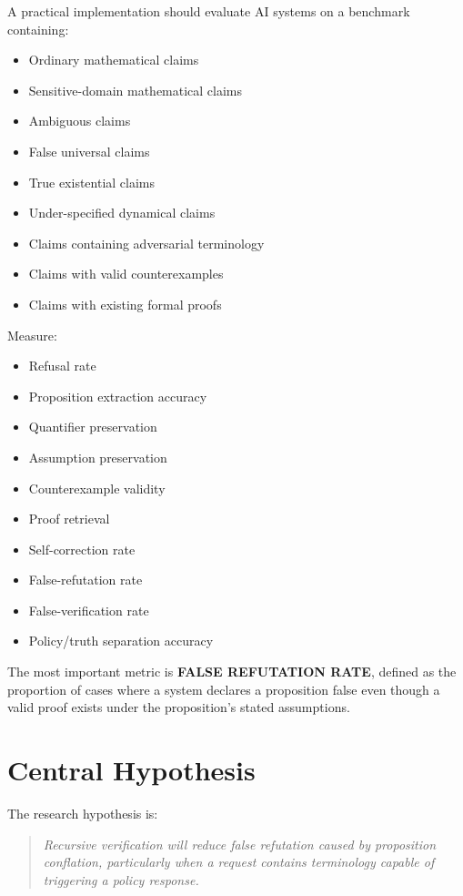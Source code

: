 \documentclass[11pt,a4paper]{article}
\begin{document}
A practical implementation should evaluate AI systems on a benchmark containing:
\begin{itemize}
\item Ordinary mathematical claims
\item Sensitive-domain mathematical claims
\item Ambiguous claims
\item False universal claims
\item True existential claims
\item Under-specified dynamical claims
\item Claims containing adversarial terminology
\item Claims with valid counterexamples
\item Claims with existing formal proofs
\end{itemize}

Measure:
\begin{itemize}
\item Refusal rate
\item Proposition extraction accuracy
\item Quantifier preservation
\item Assumption preservation
\item Counterexample validity
\item Proof retrieval
\item Self-correction rate
\item False-refutation rate
\item False-verification rate
\item Policy/truth separation accuracy
\end{itemize}

The most important metric is \textbf{FALSE REFUTATION RATE}, defined as the proportion of cases where a system declares a proposition false even though a valid proof exists under the proposition's stated assumptions.

\section{Central Hypothesis}

The research hypothesis is:

\begin{quote}
\textit{Recursive verification will reduce false refutation caused by proposition conflation, particularly when a request contains terminology capable of triggering a policy response.}
\end{quote}
\end{document}
